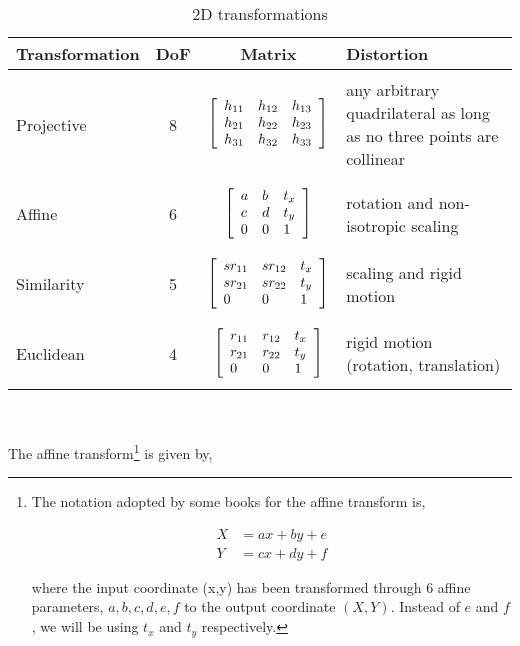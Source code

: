 								\begin{table}[t]
								\centering
								\begin{tabular}{| l | c | c | p{2.5in} |}
								\hline
								Transformation & DoF & Matrix & Distortion\\ \hline 
								& & & \\ Projective & 8 & $\left[ \begin{array}{lll} h_{11} & h_{12} & h_{13} \\ h_{21} & h_{22} & h_{23} \\ h_{31} & h_{32} & h_{33} \\ \end{array} \right]$ & any arbitrary quadrilateral as long as no three points are collinear\\  & & & \\ \hline
								& & & \\ Affine & 6 & $\left[ \begin{array}{lll} a &b & t_x \\ c & d & t_y \\ 0 & 0 & 1 \\ \end{array} \right]$ & rotation and non-isotropic scaling\\  & & & \\ \hline
								& & & \\ Similarity & 5 & $\left[ \begin{array}{lll} sr_{11} & sr_{12} & t_x \\ sr_{21} & sr_{22} & t_y \\ 0 & 0 & 1 \\ \end{array} \right]$ & scaling and rigid motion\\  & & & \\ \hline
								& & & \\ Euclidean & 4 & $\left[ \begin{array}{lll} r_{11} & r_{12} & t_x \\ r_{21} & r_{22} & t_y \\ 0 & 0 & 1 \\ \end{array} \right]$ & rigid motion (rotation, translation) \\  & & & \\ \hline
								\end{tabular}\
								\caption{2D transformations}
								\label{table:2Dtransformations}
								\end{table}

The affine transform\footnote{The notation adopted by some books for the affine transform is,

\begin{equation}
\begin{array}{llllllll}
X &= ax + by + e\\
Y &= cx + dy + f
\end{array}
\label{Eq:AffineDecomposition}
\end{equation}

where the input coordinate (x,y) has been transformed through 6 affine parameters, $a, b, c, d, e, f$ to the output coordinate $(X,Y)$.  Instead of $e$ and $f$, we will be using $t_x$ and $t_y$ respectively.}
 is given by,

